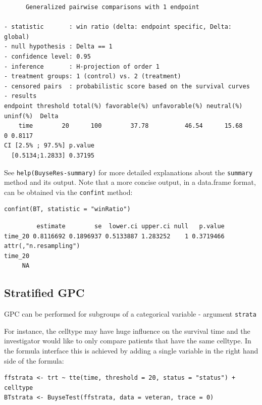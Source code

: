 \documentclass[12pt]{article}
\begin{document}
\begin{verbatim}
      Generalized pairwise comparisons with 1 endpoint

- statistic       : win ratio (delta: endpoint specific, Delta: global) 
- null hypothesis : Delta == 1 
- confidence level: 0.95 
- inference       : H-projection of order 1
- treatment groups: 1 (control) vs. 2 (treatment) 
- censored pairs  : probabilistic score based on the survival curves
- results
endpoint threshold total(%) favorable(%) unfavorable(%) neutral(%) uninf(%)  Delta
    time        20      100        37.78          46.54      15.68        0 0.8117
CI [2.5% ; 97.5%] p.value 
  [0.5134;1.2833] 0.37195
\end{verbatim}

See \texttt{help(BuyseRes-summary)} for more detailed explanations about the
\texttt{summary} method and its output. Note that a more concise output, in a
data.frame format, can be obtained via the \texttt{confint} method:
\lstset{language=r,label= ,caption= ,captionpos=b,numbers=none}
\begin{lstlisting}
confint(BT, statistic = "winRatio")
\end{lstlisting}

\begin{verbatim}
         estimate        se  lower.ci upper.ci null   p.value
time_20 0.8116692 0.1896937 0.5133887 1.283252    1 0.3719466
attr(,"n.resampling")
time_20 
     NA
\end{verbatim}

\subsection{Stratified GPC}
\label{sec:org58de1fa}

GPC can be performed for subgroups of a categorical variable \hfill -
argument \texttt{strata}

\bigskip

 For instance, the celltype may have huge influence on the survival
time and the investigator would like to only compare patients that
have the same celltype. In the formula interface this is achieved by
adding a single variable in the right hand side of the formula:
\lstset{language=r,label= ,caption= ,captionpos=b,numbers=none}
\begin{lstlisting}
ffstrata <- trt ~ tte(time, threshold = 20, status = "status") + celltype
BTstrata <- BuyseTest(ffstrata, data = veteran, trace = 0)
\end{lstlisting}
\end{document}
